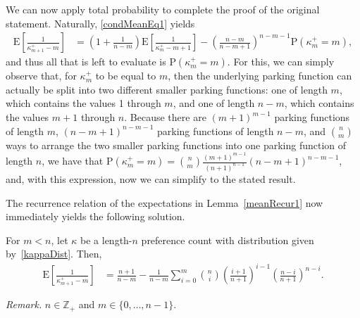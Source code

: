 \documentclass[opre,nonblindrev]{informs3_no_remark}
\newcommand{\E}[1]{{\mathrm{E}\left[#1\right]}}
\newcommand{\PP}[1]{\mathrm{P}\left( #1 \right)}
\begin{document}
We can now apply total probability to complete the proof of the original statement. Naturally, \eqref{condMeanEq1} yields
\begin{align}
\E{\frac{1}{\kappa_{m+1}^+ - m} }
&=
\left(1 + \frac{1}{n-m}\right)\E{\frac{1}{\kappa_m^+ - m + 1}}
-
\left(\frac{n-m}{n-m+1}\right)^{n-m-1}\PP{\kappa_m^+ = m}
,
\end{align}
and thus all that is left to evaluate is $\PP{\kappa_m^+ = m}$. For this, we can simply observe that, for $\kappa_m^+$ to be equal to $m$, then the underlying parking function can actually be split into two different smaller parking functions: one of length $m$, which contains the values 1 through $m$, and one of length $n - m$, which contains the values $m+1$ through $n$. Because there are $(m+1)^{m-1}$ parking functions of length $m$, $(n-m+1)^{n-m-1}$ parking functions of length $n-m$, and ${n \choose m}$ ways to arrange the two  smaller parking functions into one parking function of length $n$, we have that
$
\PP{\kappa_m^+ = m}
=
{n \choose m}\frac{(m+1)^{m-1}}{(n+1)^{n-1}}(n-m+1)^{n-m-1}
$,
and, with this expression, now we can simplify to the stated result.
\hfill\Halmos\endproof

The recurrence relation of the expectations in Lemma~\ref{meanRecur1} now immediately yields the following solution.



\begin{corollary}\label{meanRecurSolve1}
For $m < n$, let $\kappa$ be a length-$n$ preference count with distribution given by~\eqref{kappaDist}. Then,
\begin{align}
\E{\frac{1}{\kappa_{m+1}^+ - m} }
&=
\frac{n+1}{n-m}
-
\frac{1}{n-m}
\sum_{i=0}^m
{n \choose i}
\left(\frac{i+1}{n+1}\right)^{i-1}
\left(\frac{n-i}{n+1}\right)^{n-i}
.
\end{align}
\end{corollary}

\noindent\textit{Remark.} $n\in\mathbb{Z}_+$ and $m\in\{0,\dots,n-1\}$.



\end{document}
